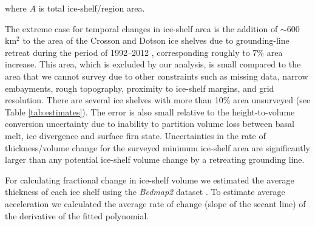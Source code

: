 \noindent
where $A$ is total ice-shelf/region area.

The extreme case for temporal changes in ice-shelf area is the addition of
$\sim$600 km$^2$ to the area of the Crosson and Dotson ice shelves due to
grounding-line retreat during the period of 1992--2012 \parencite{Rignot2014},
corresponding roughly to 7\% area increase. This area, which is excluded by
our analysis, is small compared to the area that we cannot survey due to other
constraints such as missing data, narrow embayments, rough topography,
proximity to ice-shelf margins, and grid resolution. There are several ice
shelves with more than 10\% area unsurveyed (see Table \ref{tab:estimates}). The
error is also small relative to the height-to-volume conversion uncertainty
due to inability to partition volume loss between basal melt, ice divergence
and surface firn state. Uncertainties in the rate of thickness/volume change
for the surveyed minimum ice-shelf area are significantly larger than any
potential ice-shelf volume change by a retreating grounding line.

For calculating fractional change in ice-shelf volume we estimated the average
thickness of each ice shelf using the \emph{Bedmap2} dataset
\parencite{Fretwell2013}. To estimate average acceleration we calculated the
average rate of change (slope of the secant line) of the derivative of the
fitted polynomial.


